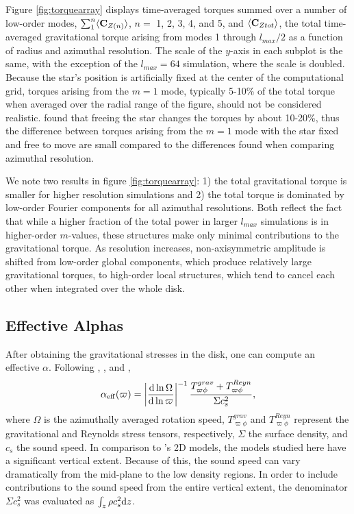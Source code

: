 \documentclass[manuscript]{aastex}
\begin{document}
Figure \ref{fig:torquearray} displays 
 time-averaged torques summed over a number of low-order modes, $\sum_1^n \langle {\rm \bf C}_{Z(n)} \rangle$, $n = $ 1, 2, 3, 4, and 5, and $\langle {\rm \bf C}_{Ztot} \rangle$,
the total time-averaged gravitational torque arising from modes 1 through $l_{max}/2$
as a function of radius and azimuthal resolution. 
The scale of the $y$-axis in each subplot is the same, with the exception of the $l_{max} = 64$ simulation, 
where the scale is doubled.  
Because the star's position is artificially fixed at the center of the computational grid, 
torques arising from the $m=1$ mode,
typically 5-10\% of the total torque when averaged over the radial range of the figure,
should not be considered realistic.  
\citet{michael2010} found that freeing the star changes the torques by about 10-20\%, 
thus the difference between torques arising from the $m=1$ mode with the star fixed and free to move are small compared to the differences found when comparing azimuthal resolution.

We note two results in figure \ref{fig:torquearray}: 1) the total gravitational torque is smaller for higher resolution simulations and 2) the total torque is dominated by low-order Fourier components for all azimuthal resolutions. Both reflect the fact that while a higher fraction of the total power in larger $l_{max}$ simulations is in higher-order $m$-values, these structures make only minimal contributions to the gravitational torque. As resolution increases, non-axisymmetric amplitude is shifted from 
low-order global components, which produce relatively large gravitational torques, to high-order local structures, which tend to cancel each other when integrated over the whole disk. 


\subsection{Effective Alphas}

After obtaining the gravitational stresses in the disk, one can compute an effective $\alpha$. 
Following \cite{gammie2001}, \citet{lodato2004}, and \citet{boley2006}, 
\begin{equation}
\label{alpha1}
\alpha_{\rm{eff}}(\varpi) = \left| \frac{{\rm d} \ln \Omega}{{\rm d} \ln \varpi} \right|^{-1} 
\frac {T_{\varpi\phi}^{grav} + T_{\varpi\phi}^{Reyn}}
{\Sigma c_s^2 },
\end{equation}
where $\Omega$ is the azimuthally averaged rotation speed, $T_{\varpi\phi}^{grav}$ and $T_{\varpi\phi}^{Reyn}$ represent the  gravitational and Reynolds stress tensors, respectively, $\Sigma$ the surface density,
and $c_s$ the sound speed. In comparison to \citeauthor{gammie2001}'s 2D models, the models studied here have a significant vertical extent. Because of this, the sound speed can vary dramatically from the mid-plane to the low density regions. In order to include contributions to the sound speed from the entire vertical extent, the denominator $\Sigma c_s^2$ was evaluated as $\int_z \rho c_s^2 {\rm d}z$.
 
\end{document}
